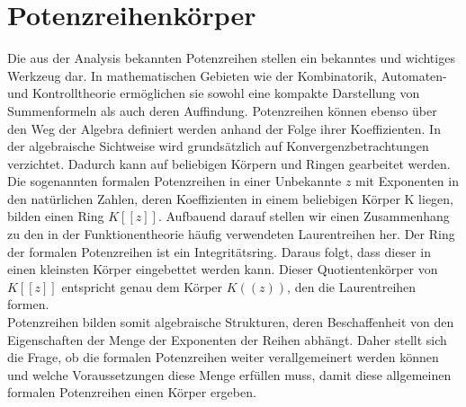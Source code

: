 \chapter{Potenzreihenkörper}\label{chap3}
%
Die aus der Analysis bekannten Potenzreihen stellen ein bekanntes und wichtiges Werkzeug dar. In mathematischen Gebieten wie der Kombinatorik, Automaten- und Kontrolltheorie ermöglichen sie sowohl eine kompakte Darstellung von Summenformeln als auch deren Auffindung. Potenzreihen können ebenso über den Weg der Algebra definiert werden anhand der Folge ihrer Koeffizienten. In der algebraische Sichtweise wird grundsätzlich auf Konvergenzbetrachtungen verzichtet. Dadurch kann auf beliebigen Körpern und Ringen gearbeitet werden. \\
Die sogenannten formalen Potenzreihen in einer Unbekannte $z$ mit Exponenten in den natürlichen Zahlen, deren Koeffizienten in einem beliebigen Körper K liegen, bilden einen Ring $K[[z]]$. Aufbauend darauf stellen wir einen Zusammenhang zu den in der Funktionentheorie häufig verwendeten Laurentreihen her. Der Ring der formalen Potenzreihen ist ein Integritätsring. Daraus folgt, dass dieser in einen kleinsten Körper eingebettet werden kann. Dieser Quotientenkörper von $K[[z]]$ entspricht genau dem Körper $K((z))$, den die Laurentreihen formen. \\
Potenzreihen bilden somit algebraische Strukturen, deren Beschaffenheit von den Eigenschaften der Menge der Exponenten der Reihen abhängt. Daher stellt sich die Frage, ob die formalen Potenzreihen weiter verallgemeinert werden können und welche Voraussetzungen diese Menge erfüllen muss, damit diese allgemeinen formalen Potenzreihen einen Körper ergeben. %

